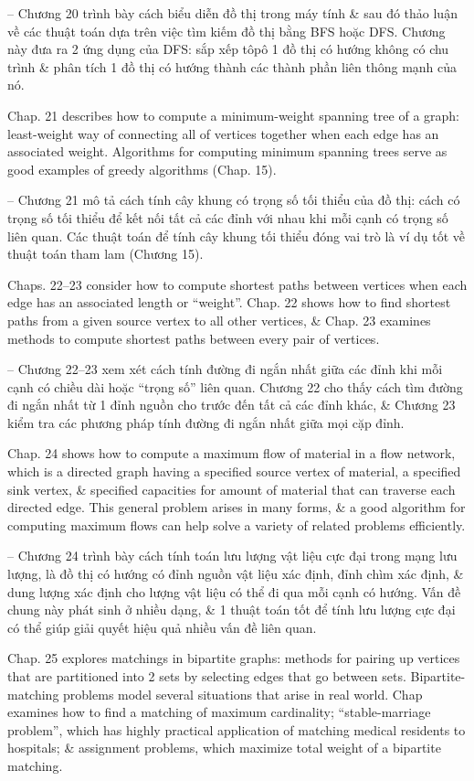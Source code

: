 \documentclass{article}
\begin{document}
\begin{itemize}
\begin{itemize}
		-- Chương 20 trình bày cách biểu diễn đồ thị trong máy tính \& sau đó thảo luận về các thuật toán dựa trên việc tìm kiếm đồ thị bằng BFS hoặc DFS. Chương này đưa ra 2 ứng dụng của DFS: sắp xếp tôpô 1 đồ thị có hướng không có chu trình \& phân tích 1 đồ thị có hướng thành các thành phần liên thông mạnh của nó.
		
		Chap. 21 describes how to compute a minimum-weight spanning tree of a graph: least-weight way of connecting all of vertices together when each edge has an associated weight. Algorithms for computing minimum spanning trees serve as good examples of greedy algorithms (Chap. 15).
		
		-- Chương 21 mô tả cách tính cây khung có trọng số tối thiểu của đồ thị: cách có trọng số tối thiểu để kết nối tất cả các đỉnh với nhau khi mỗi cạnh có trọng số liên quan. Các thuật toán để tính cây khung tối thiểu đóng vai trò là ví dụ tốt về thuật toán tham lam (Chương 15).
		
		Chaps. 22--23 consider how to compute shortest paths between vertices when each edge has an associated length or ``weight''. Chap. 22 shows how to find shortest paths from a given source vertex to all other vertices, \& Chap. 23 examines methods to compute shortest paths between every pair of vertices.
		
		-- Chương 22--23 xem xét cách tính đường đi ngắn nhất giữa các đỉnh khi mỗi cạnh có chiều dài hoặc ``trọng số'' liên quan. Chương 22 cho thấy cách tìm đường đi ngắn nhất từ 1 đỉnh nguồn cho trước đến tất cả các đỉnh khác, \& Chương 23 kiểm tra các phương pháp tính đường đi ngắn nhất giữa mọi cặp đỉnh.
		
		Chap. 24 shows how to compute a maximum flow of material in a flow network, which is a directed graph having a specified source vertex of material, a specified sink vertex, \& specified capacities for amount of material that can traverse each directed edge. This general problem arises in many forms, \& a good algorithm for computing maximum flows can help solve a variety of related problems efficiently.
		
		-- Chương 24 trình bày cách tính toán lưu lượng vật liệu cực đại trong mạng lưu lượng, là đồ thị có hướng có đỉnh nguồn vật liệu xác định, đỉnh chìm xác định, \& dung lượng xác định cho lượng vật liệu có thể đi qua mỗi cạnh có hướng. Vấn đề chung này phát sinh ở nhiều dạng, \& 1 thuật toán tốt để tính lưu lượng cực đại có thể giúp giải quyết hiệu quả nhiều vấn đề liên quan.
		
		Chap. 25 explores matchings in bipartite graphs: methods for pairing up vertices that are partitioned into 2 sets by selecting edges that go between sets. Bipartite-matching problems model several situations that arise in real world. Chap examines how to find a matching of maximum cardinality; ``stable-marriage problem'', which has highly practical application of matching medical residents to hospitals; \& assignment problems, which maximize total weight of a bipartite matching.
		

\end{itemize}
\end{itemize}
\end{document}

